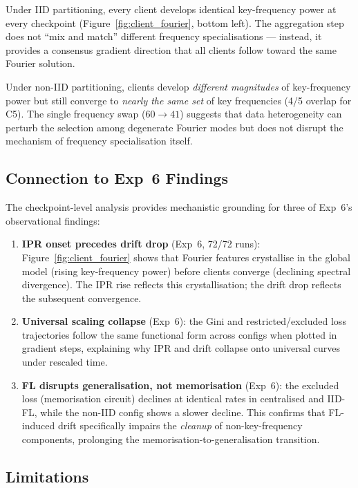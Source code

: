 \documentclass{article}
\begin{document}
Under IID partitioning, every client develops identical key-frequency power
at every checkpoint (Figure~\ref{fig:client_fourier}, bottom left).  The
aggregation step does not ``mix and match'' different frequency
specialisations --- instead, it provides a consensus gradient direction that
all clients follow toward the same Fourier solution.

Under non-IID partitioning, clients develop \emph{different magnitudes} of
key-frequency power but still converge to \emph{nearly the same set} of key
frequencies (4/5 overlap for C5).  The single frequency swap
($60 \to 41$) suggests that data heterogeneity can perturb the selection
among degenerate Fourier modes but does not disrupt the mechanism of
frequency specialisation itself.

\subsection{Connection to Exp~6 Findings}

The checkpoint-level analysis provides mechanistic grounding for three of
Exp~6's observational findings:

\begin{enumerate}[nosep]
\item \textbf{IPR onset precedes drift drop} (Exp~6, 72/72 runs):
Figure~\ref{fig:client_fourier} shows that Fourier features crystallise
in the global model (rising key-frequency power) before clients converge
(declining spectral divergence).  The IPR rise reflects this
crystallisation; the drift drop reflects the subsequent convergence.

\item \textbf{Universal scaling collapse} (Exp~6): the Gini and restricted/excluded
loss trajectories follow the same functional form across configs when
plotted in gradient steps, explaining why IPR and drift collapse onto
universal curves under rescaled time.

\item \textbf{FL disrupts generalisation, not memorisation} (Exp~6):
the excluded loss (memorisation circuit) declines at identical rates
in centralised and IID-FL, while the non-IID config shows a slower decline.
This confirms that FL-induced drift specifically impairs the \emph{cleanup}
of non-key-frequency components, prolonging the memorisation-to-generalisation
transition.
\end{enumerate}

\subsection{Limitations}
\end{document}
